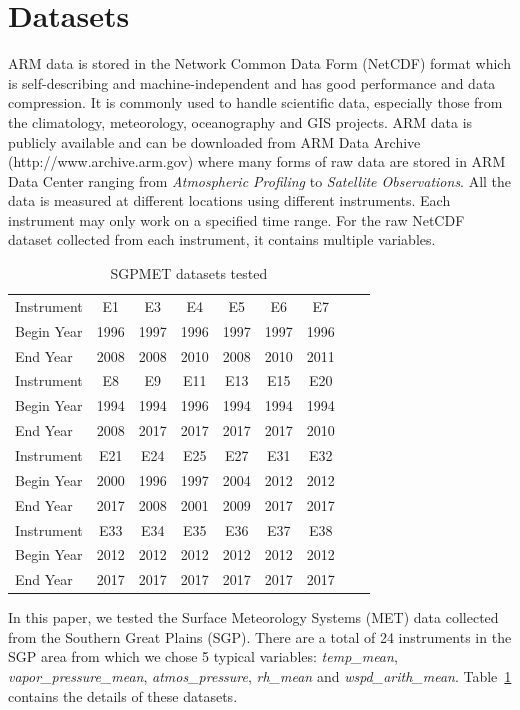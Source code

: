\documentclass[letterpaper, 10 pt, conference]{ieeeconf}  %
\begin{document}
\section{Datasets}
ARM data is stored in the Network Common Data Form (NetCDF) format which is self-describing and machine-independent \cite{rew1990netcdf, NetCDF} and has good performance and data compression. It is commonly used to handle scientific data, especially those from the climatology, meteorology, oceanography and GIS projects. ARM data is publicly available and can be downloaded from ARM Data Archive (http://www.archive.arm.gov) where many forms of raw data are stored in ARM Data Center ranging from \textit{Atmospheric Profiling} to \textit{Satellite Observations}. All the data is measured at different locations using different instruments. Each instrument may only work on a specified time range. For the raw NetCDF dataset collected from each instrument, it contains multiple variables. 

\begin{table}[ht]
\caption{SGPMET datasets tested}
\label{tab:datasets}
\centering
\begin{tabular}{|l|c|c|c|c|c|c|c|c|}
\hline
Instrument & E1 & E3 & E4 & E5 & E6 & E7\\
Begin Year & 1996 & 1997 & 1996 & 1997 & 1997 & 1996\\
End Year & 2008 & 2008 & 2010 & 2008 & 2010 & 2011\\
\hline
Instrument & E8 & E9 & E11 & E13 & E15 & E20\\
Begin Year & 1994 & 1994 & 1996 & 1994 & 1994 & 1994\\
End Year & 2008 & 2017 & 2017 & 2017 & 2017 & 2010\\
\hline
Instrument & E21 & E24 & E25 & E27 & E31 & E32\\
Begin Year & 2000 & 1996 & 1997 & 2004 & 2012 & 2012\\
End Year & 2017 & 2008 & 2001 & 2009 & 2017 & 2017\\
\hline
Instrument & E33 & E34 & E35 & E36 & E37 & E38\\
Begin Year & 2012 & 2012 & 2012 & 2012 & 2012 & 2012\\
End Year & 2017 & 2017 & 2017 & 2017 & 2017 & 2017\\
\hline
\end{tabular}
\end{table}

In this paper, we tested the Surface Meteorology Systems (MET) data collected from the Southern Great Plains (SGP). There are a total of 24 instruments in the SGP area from which we chose 5 typical variables: \textit{temp\_mean}, \textit{vapor\_pressure\_mean}, \textit{atmos\_pressure}, \textit{rh\_mean} and \textit{wspd\_arith\_mean}. Table~\ref{tab:datasets} contains the details of these datasets. 
\end{document}
